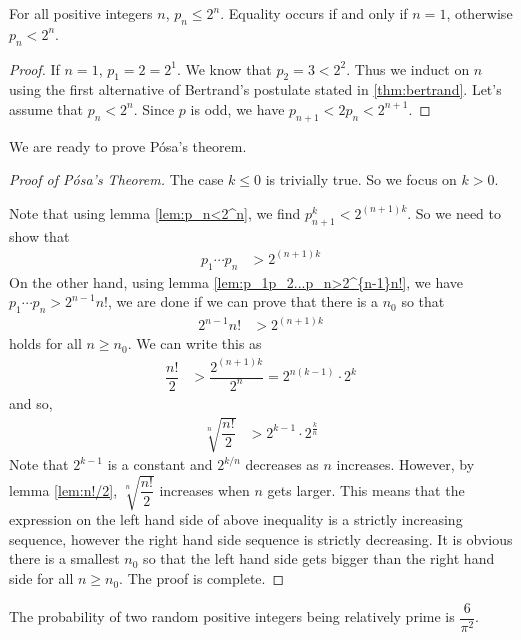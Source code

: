 \documentclass{subfiles}
\begin{document}
	\begin{lemma}
		For all positive integers $n$, $p_{n}\leq 2^{n}$. Equality occurs if and only if $n=1$, otherwise $p_n<2^n$.\label{lem:p_n<2^n}
	\end{lemma}

	\begin{proof}
		If $n=1$, $p_1=2=2^1$. We know that $p_2=3<2^2$. Thus we induct on $n$ using the first alternative of Bertrand's postulate stated in \autoref{thm:bertrand}. Let's assume that $p_n<2^n$. Since $p$ is odd, we have $p_{n+1}<2p_n<2^{n+1}$.
	\end{proof}

	We are ready to prove P\'{o}sa's theorem.

	\begin{proof}[Proof of P\'osa's Theorem]
		The case $k\leq0$ is trivially true. So we focus on $k>0$.

		Note that using lemma \eqref{lem:p_n<2^n}, we find $p_{n+1}^k<2^{(n+1)k}$. So we need to show that
			\begin{align*}
				p_1\cdots p_n & > 2^{(n+1)k}
			\end{align*}
		On the other hand, using lemma \eqref{lem:p_1p_2...p_n>2^{n-1}n!}, we have $p_1\cdots p_n > 2^{n-1}n!$, we are done if we can prove that there is a $n_0$ so that
			\begin{align*}
				2^{n-1}n! & >2^{(n+1)k}
			\end{align*}
		holds for all $n\geq n_0$. We can write this as
			\begin{align*}
				\dfrac{n!}{2} & >\dfrac{2^{(n+1)k}}{2^n} =2^{n(k-1)}\cdot2^k
			\end{align*}
		and so,
			\begin{align*}
				\sqrt[n]{\dfrac{n!}{2}}&>2^{k-1}\cdot2^{\frac{k}{n}}
			\end{align*}
		Note that $2^{k-1}$ is a constant and $2^{k/n}$ decreases as $n$ increases. However, by lemma \eqref{lem:n!/2}, $\sqrt[n]{\dfrac{n!}{2}}$ increases when $n$ gets larger. This means that the expression on the left hand side of above inequality is a strictly increasing sequence, however the right hand side sequence is strictly decreasing. It is obvious there is a smallest $n_0$ so that the left hand side gets bigger than the right hand side for all $n\geq n_0$. The proof is complete.
	\end{proof}

	\begin{theorem}
		The probability of two random positive integers being relatively prime is $\dfrac{6}{\pi^2}$.
	\end{theorem}
\end{document}
